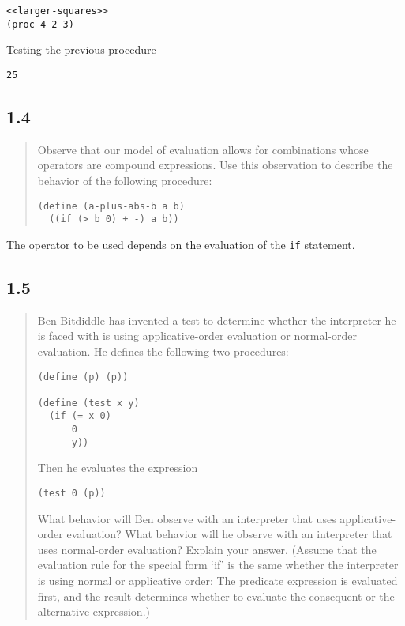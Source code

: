 \documentclass[a4paper, titlepage, twoside]{article}
\begin{document}
\begin{listing}[H]
\begin{verbatim}
<<larger-squares>>
(proc 4 2 3)
\end{verbatim}
\caption{Testing the previous procedure}
\end{listing}

\begin{verbatim}
25
\end{verbatim}

\subsection*{1.4}
\label{sec:orgccc8909}

\begin{quote}
Observe that our model of evaluation allows for combinations whose operators are compound expressions. Use this observation to describe the behavior of the following procedure:

\begin{verbatim}
(define (a-plus-abs-b a b)
  ((if (> b 0) + -) a b))
\end{verbatim}
\end{quote}

The operator to be used depends on the evaluation of the \texttt{if} statement.

\subsection*{1.5}
\label{sec:orgdcf3ac3}

\begin{quote}
Ben Bitdiddle has invented a test to determine whether the interpreter he is faced with is using applicative-order evaluation or normal-order evaluation.  He defines the following two procedures:

\begin{verbatim}
(define (p) (p))

(define (test x y)
  (if (= x 0)
      0
      y))
\end{verbatim}

Then he evaluates the expression

\begin{verbatim}
(test 0 (p))
\end{verbatim}

What behavior will Ben observe with an interpreter that uses applicative-order evaluation?  What behavior will he observe with an interpreter that uses normal-order evaluation?  Explain your answer.  (Assume that the evaluation rule for the special form `if' is the same whether the interpreter is using normal or applicative order: The predicate expression is evaluated first, and the result determines whether to evaluate the consequent or the alternative expression.)
\end{quote}
\end{document}
